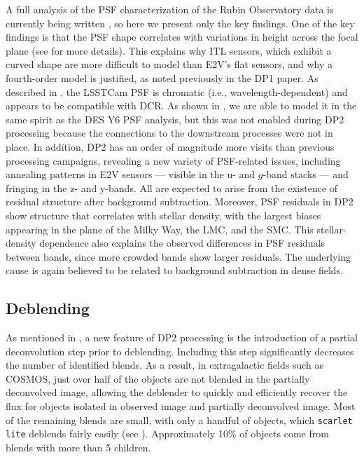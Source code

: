 A full analysis of the PSF characterization of the Rubin Observatory data is currently being written \citep[][]{RTN-126}, so here
we present only the key findings.
One of the key findings is that the PSF shape correlates with variations in height across the focal plane (see \citealt[][]{RTN-108} for more details).
This explains why ITL sensors, which exhibit a curved shape are more difficult to model than E2V's flat sensors, and why a fourth-order model is justified, as noted previously in the \gls{DP1} paper.
As described in \citet[][]{SITCOMTN-174}, the LSSTCam PSF is chromatic (i.e., wavelength-dependent) and appears to be compatible with \gls{DCR}.
As shown in \citet[][]{SITCOMTN-174}, we are able to model it in the same spirit as the DES Y6 PSF analysis, but this was not enabled during DP2 processing because the connections to the downstream processes were not in place.
In addition, DP2 has an order of magnitude more visits than previous processing campaigns, revealing a new variety of \gls{PSF}-related issues, including annealing patterns in E2V sensors — visible in the u- and $g$-band stacks — and fringing in the z- and y-bands.
All are expected to arise from the existence of residual structure after \gls{background} subtraction.
Moreover, \gls{PSF} residuals in DP2 show structure that correlates with stellar density, with the largest biases appearing in the plane of the Milky Way, the LMC, and the SMC.
This stellar-density dependence also explains the observed differences in \gls{PSF} residuals between bands, since more crowded bands show larger residuals.
The underlying cause is again believed to be related to \gls{background} subtraction in dense fields.

\subsection{Deblending}
As mentioned in , a new feature of \gls{DP2} processing is the introduction of a partial deconvolution step prior to deblending.
Including this step significantly decreases the number of identified blends.
As a result, in extragalactic fields such as \gls{COSMOS}, just over half of the objects are not blended in the partially deconvolved image, allowing the deblender to quickly and efficiently recover the flux for objects isolated in observed image and partially deconvolved image.
Most of the remaining blends are small, with only a handful of objects, which \texttt{\gls{scarlet lite}} deblends fairly easily (see ).
Approximately 10\% of objects come from blends with more than 5 children.

